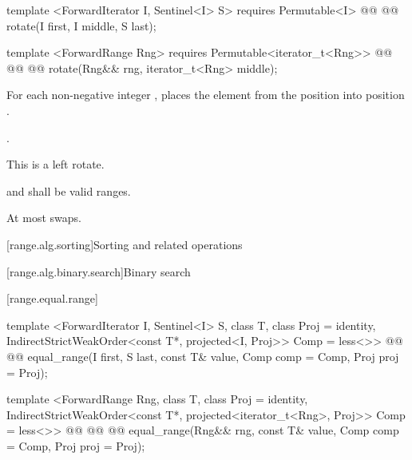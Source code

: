 %
\begin{itemdecl}
template <ForwardIterator I, Sentinel<I> S>
  requires Permutable<I>
  @@
  @@
    rotate(I first, I middle, S last);

template <ForwardRange Rng>
  requires Permutable<iterator_t<Rng>>
  @@
              @@
  @@
    rotate(Rng&& rng, iterator_t<Rng> middle);
\end{itemdecl}

\begin{itemdescr}
\pnum
\effects
For each non-negative integer
,
places the element from the position
into position
.

\pnum
\returns {}.

\pnum
\notes
This is a left rotate.

\pnum
\requires
{}
and
shall be valid ranges.

\pnum
\complexity
At most
swaps.
\end{itemdescr}

[range.alg.sorting]{Sorting and related operations}

\setcounter{subsubsection}{2}
[range.alg.binary.search]{Binary search}

\setcounter{paragraph}{2}
[range.equal.range]{}

%
\begin{itemdecl}
template <ForwardIterator I, Sentinel<I> S, class T, class Proj = identity,
    IndirectStrictWeakOrder<const T*, projected<I, Proj>> Comp = less<>>
  @@
  @@
    equal_range(I first, S last, const T& value, Comp comp = Comp{}, Proj proj = Proj{});

template <ForwardRange Rng, class T, class Proj = identity,
    IndirectStrictWeakOrder<const T*, projected<iterator_t<Rng>, Proj>> Comp = less<>>
  @@
              @@
  @@
    equal_range(Rng&& rng, const T& value, Comp comp = Comp{}, Proj proj = Proj{});
\end{itemdecl}

